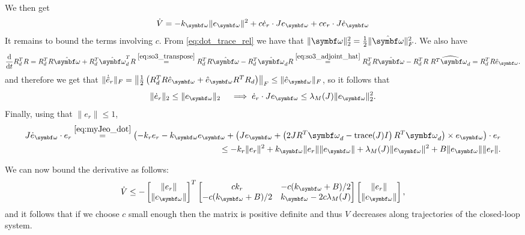 We then get
\begin{equation}
  \begin{aligned}
    \dot V = -k_\bomega \| e_\bomega \|^2 + c \dot e_r \cdot J e_\bomega + c e_r \cdot J \dot e_\bomega
  \end{aligned}
\end{equation}
It remains to bound the terms involving $c$. From \eqref{eq:dot_trace_rel} we have that $\| \bomega \|_2^2 = \frac{1}{2} \| \hat \bomega \|_F^2$. We also have
\begin{equation}
  \frac{\mathrm{d}}{\mathrm{d}t} R_d^T R = R_d^T R \hat \bomega + R_d^T \hat \bomega_d^T R \overset{\eqref{eq:so3_transpose}} = R_d^T R \hat \bomega - R_d^T \hat \bomega_d R \overset{\eqref{eq:so3_adjoint_hat}}= R_d^T R \hat \bomega - R_d^T R \; \widehat{R^T \bomega_d} = R_d^T R \hat e_\bomega.
\end{equation}
and therefore we get that $\| \dot {\hat {e}}_r \|_F = \left\| \frac{1}{2} \left( R_d^T R \hat e_\bomega + \hat e_\bomega R^T R_d \right) \right\|_F \leq \| \hat e_\bomega \|_F$, so it follows that
\begin{equation}
  \| \dot e_r \|_2 \leq \| e_\bomega \|_2 \quad \implies \dot e_r \cdot J e_\bomega \leq \lambda_M(J) \| e_\bomega \|^2_2.
\end{equation}
Finally, using that $\| e_r \| \leq 1$,
\begin{equation}
  \begin{aligned}
    J \dot e_\bomega \cdot  e_r  \overset{\eqref{eq:myJeo_dot}}= \left( -k_r e_r - k_\bomega e_\bomega + \left( J e_\bomega + \left(2 J R^T \bomega_d - \text{trace}(J) I \right) R^T \bomega_d \right) \times e_\bomega \right) \cdot e_r \\
    \leq - k_r \| e_r \|^2 + k_\bomega \| e_r \| \| e_\bomega \| + \lambda_M(J) \| e_\bomega \|^2 + B \| e_\bomega \| \| e_r \|.
  \end{aligned}
\end{equation}
\begin{tcolorbox}
  We can now bound the derivative as follows:
  \begin{equation}
    \dot V \leq
    - \begin{bmatrix}
      \| e_r \| \\ \| e_\bomega \|
    \end{bmatrix}^T
    \begin{bmatrix}
      c k_r               & -c(k_\bomega + B)/2         \\
      -c(k_\bomega + B)/2 & k_\bomega - 2c \lambda_M(J)
    \end{bmatrix}
    \begin{bmatrix}
      \| e_r \| \\ \| e_\bomega \|
    \end{bmatrix},
  \end{equation}
  and it follows that if we choose $c$ small enough then the matrix is positive definite and thus $V$ decreases along trajectories of the closed-loop system.
\end{tcolorbox}


